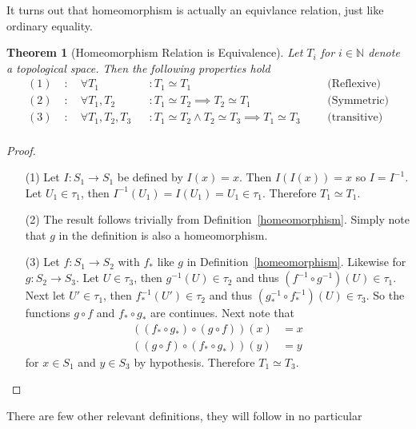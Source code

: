 \documentclass{article}
\theoremstyle{plain}
\newtheorem{theorem}{Theorem}
\theoremstyle{definition}
\newcommand{\N}{\mathbb{N}}
\begin{document}
It turns out that homeomorphism is actually an equivlance relation, just like
ordinary equality.
\begin{theorem}[Homeomorphism Relation is Equivalence]
	Let $T_i$ for $i\in\N$ denote a topological space. Then the following
	properties hold
	\begin{equation}
	\begin{aligned}
		(1)\; &:\quad\forall T_1 &&: T_1\simeq T_1 &&&\text{(Reflexive)}\\
		(2)\; &:\quad\forall T_1,T_2 &&: T_1\simeq T_2\implies T_2\simeq T_1 
		&&&\text{(Symmetric)}\\
		(3)\; &:\quad\forall T_1,T_2,T_3 &&: T_1\simeq T_2\land T_2\simeq T_3
		\implies T_1\simeq T_3 &&&\text{(transitive)}\\
	\end{aligned}
	\end{equation}
\end{theorem}
\begin{proof}
$\ $\newline
\begin{itemize}
	\item[(1)] Let $I:S_1\rightarrow S_1$ be defined by $I(x)=x$. Then
		$I(I(x))=x$ so $I=I^{-1}$. Let $U_1\in \tau_1$, then
		$I^{-1}(U_1)=I(U_1)=U_1\in\tau_1$. Therefore $T_1\simeq T_1$.
	\item[(2)] The result follows trivially from
		Definition~\ref{homeomorphism}. Simply note that $g$ in the definition
		is also a homeomorphism.
	\item[(3)] Let $f:S_1\rightarrow S_2$ with $f_*$ like $g$ in
		Definition~\ref{homeomorphism}. Likewise for $g:S_2\rightarrow S_3$.
		Let $U\in\tau_3$, then $g^{-1}(U)\in\tau_2$ and thus $(f^{-1}\circ
		g^{-1})(U)\in\tau_1$. Next let $U'\in\tau_1$, then
		$f_*^{-1}(U')\in\tau_2$ and thus $(g_*^{-1}\circ
		f_*^{-1})(U)\in\tau_3$. So the functions $g\circ f$ and 
		$f_*\circ g_*$ are continues. Next note that 
		\begin{equation}
		\begin{aligned}
			((f_*\circ g_*)\circ (g\circ f))(x)&=x\\
			((g\circ f)\circ (f_*\circ g_*))(y)&=y
		\end{aligned}
		\end{equation}
		for $x\in S_1$ and $y\in S_3$ by hypothesis. Therefore $T_1\simeq T_3$.
\end{itemize}
\end{proof}
There are few other relevant definitions, they will follow in no particular
\end{document}
